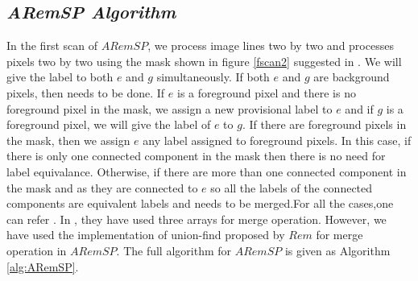 \subsection{\em{ARemSP} Algorithm}
In the first scan of $ARemSP$, we process image lines two by two and processes pixels two by two using the mask shown in figure \ref{fscan2} suggested 
in \cite{He2012_ARun}. We will give the label to both $e$ and $g$ simultaneously. If both $e$ and $g$ are background pixels,
then needs to be done. If $e$ is a foreground pixel and there is no foreground pixel in the mask, we assign a new provisional label
to $e$ and if $g$ is a foreground pixel, we will give the label of $e$ to $g$. If there are foreground pixels in the mask, then we 
assign $e$ any label assigned to foreground pixels. In this case, if there is only one connected component in the mask then there is 
no need for label equivalance. Otherwise, if there are more than one connected component in the mask and as they are connected to $e$ so
all the labels of the connected components are equivalent labels and needs to be merged.For all the cases,one can refer \cite{He2012_ARun}.
In \cite{He2012_ARun}, they have used three arrays for merge operation. However, we have used the implementation of union-find proposed by 
$Rem$ \cite{Patwary2010_RemSP} for merge operation in $ARemSP$. The full
algorithm for $ARemSP$ is given as Algorithm \ref{alg:ARemSP}.





 
